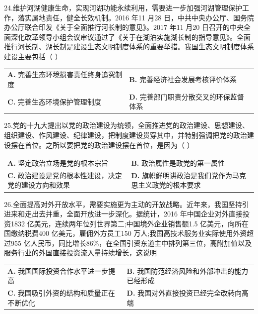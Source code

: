 \documentclass[UTF8,11pt]{ctexart}
\begin{document}
24.维护河湖健康生命，实现河湖功能永续利用，需要进一步加强河湖管理保护工作，落实属地责任，健全长效机制。2016 年11 月28 日，中共中央办公厅、国务院办公厅联合印发《关于全面推行河长制的意见》。2017 年11 月20 日召开的中央全面深化改革领导小组会议审议通过了《关于在湖泊实施湖长制的指导意见》。全面推行河长制、湖长制是建设生态文明制度体系的重要举措。我国生态文明制度体系建设主要包括（      ）


\begin{center}\begin{tabular}{>{\raggedright\arraybackslash}p{\dimexpr(\linewidth-4\tabcolsep)/2\relax}>{\raggedright\arraybackslash}p{\dimexpr(\linewidth-4\tabcolsep)/2\relax}}
\textbf{A.} 完善生态环境损害责任终身追究制度 & \textbf{B.} 完善经济社会发展考核评价体系\\[.35em]
\textbf{C.} 完善生态环境保护管理制度 & \textbf{D.} 完善部门职责分散交叉的环保监督体系\\[.35em]\end{tabular}\end{center}

25.党的十九大提出以党的政治建设为统领，全面推进党的政治建设、思想建设、组织建设、作风建设、纪律建设，把制度建设贯穿其中，并特别强调把党的政治建设摆在首位。之所以要把党的政治建设摆在首位，是因为（      ）


\begin{center}\begin{tabular}{>{\raggedright\arraybackslash}p{\dimexpr(\linewidth-4\tabcolsep)/2\relax}>{\raggedright\arraybackslash}p{\dimexpr(\linewidth-4\tabcolsep)/2\relax}}
\textbf{A.} 坚定政治立场是党的根本宗旨 & \textbf{B.} 政治属性是政党的第一属性\\[.35em]
\textbf{C.} 政治建设是党的根本性建设，决定党的建设方向和效果 & \textbf{D.} 旗帜鲜明讲政治是我们党作为马克思主义政党的根本要求\\[.35em]\end{tabular}\end{center}

26.全面提高对外开放水平，需要实施更为主动的开放战略。近年来，我国坚持引进来和走出去并重，全面开放进一步深化。据统计，2016 年中国企业对外直接投资1832 亿美元，连续两年位列世界第二;中国境外企业销售额1.5 亿美元，向所在国缴纳税费400 亿美元，雇佣外方员工150 万人;我国高技术服务业实际使用外资超过955 亿人民币，同比增长86\%，在全国引资东道主中排列第三位，高附加值以及服务行业的外国直接投资流入量持续增长，这说明


\begin{center}\begin{tabular}{>{\raggedright\arraybackslash}p{\dimexpr(\linewidth-4\tabcolsep)/2\relax}>{\raggedright\arraybackslash}p{\dimexpr(\linewidth-4\tabcolsep)/2\relax}}
\textbf{A.} 我国国际投资合作水平进一步提高 & \textbf{B.} 我国防范经济风险和外部冲击的能力已经形成\\[.35em]
\textbf{C.} 我国吸引外资的结构和质量正在不断优化 & \textbf{D.} 我国对外直接投资已经完全改转向高端\\[.35em]\end{tabular}\end{center}
\end{document}
